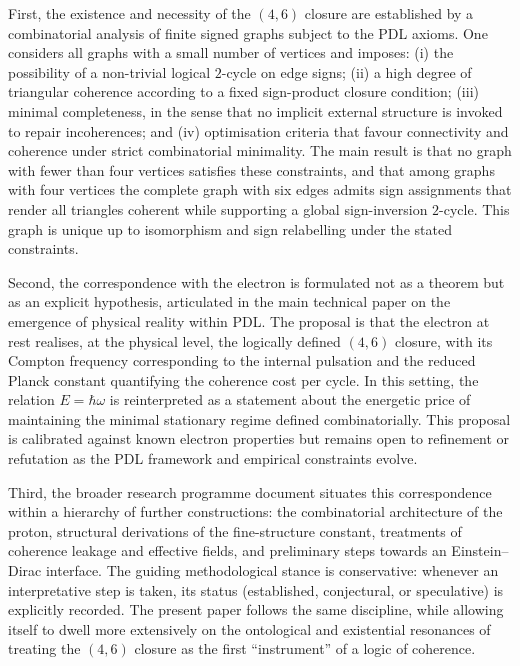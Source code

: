 \documentclass[11pt,a4paper]{article}
\theoremstyle{definition}
\begin{document}
First, the existence and necessity of the \((4,6)\) closure are established by a combinatorial analysis of finite signed graphs subject to the PDL axioms. One considers all graphs with a small number of vertices and imposes: (i) the possibility of a non-trivial logical \(2\)-cycle on edge signs; (ii) a high degree of triangular coherence according to a fixed sign-product closure condition; (iii) minimal completeness, in the sense that no implicit external structure is invoked to repair incoherences; and (iv) optimisation criteria that favour connectivity and coherence under strict combinatorial minimality.\cite{Laubscher_MinimalClosures_46_2024} The main result is that no graph with fewer than four vertices satisfies these constraints, and that among graphs with four vertices the complete graph with six edges admits sign assignments that render all triangles coherent while supporting a global sign-inversion \(2\)-cycle. This graph is unique up to isomorphism and sign relabelling under the stated constraints.\cite{Laubscher_MinimalClosures_46_2024}

Second, the correspondence with the electron is formulated not as a theorem but as an explicit hypothesis, articulated in the main technical paper on the emergence of physical reality within PDL.\cite{Laubscher_EmergencePhysicalReality_2024} The proposal is that the electron at rest realises, at the physical level, the logically defined \((4,6)\) closure, with its Compton frequency corresponding to the internal pulsation and the reduced Planck constant quantifying the coherence cost per cycle. In this setting, the relation \(E = \hbar \omega\) is reinterpreted as a statement about the energetic price of maintaining the minimal stationary regime defined combinatorially. This proposal is calibrated against known electron properties but remains open to refinement or refutation as the PDL framework and empirical constraints evolve.\cite{Laubscher_EmergencePhysicalReality_2024,Laubscher_PDL_Position_2024,Laubscher_PDL_GlobalMapping_v6_2024}

Third, the broader research programme document situates this correspondence within a hierarchy of further constructions: the combinatorial architecture of the proton, structural derivations of the fine-structure constant, treatments of coherence leakage and effective fields, and preliminary steps towards an Einstein--Dirac interface.\cite{Laubscher_PDL_Position_2024,Laubscher_ProtonArch_v2_2024,Laubscher_Alpha_v2_2024,Laubscher_EffectiveFields_2024,Laubscher_Einstein_Dirac_2024} The guiding methodological stance is conservative: whenever an interpretative step is taken, its status (established, conjectural, or speculative) is explicitly recorded. The present paper follows the same discipline, while allowing itself to dwell more extensively on the ontological and existential resonances of treating the \((4,6)\) closure as the first ``instrument'' of a logic of coherence.
\end{document}
